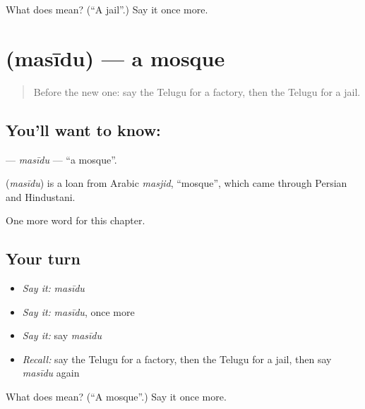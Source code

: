 \begin{tcolorbox}[breakable,colback=teal!4,colframe=teal!35!black,title={Before you move on}]
What does  mean? (\textquotedblleft{}A jail\textquotedblright{}.) Say it once more.
\end{tcolorbox}
\section[\texorpdfstring{\te{మసీదు} (masīdu)}{మసీదు (masīdu)}]{ (masīdu) — a mosque}

\label{lesson:TE-C293-masidu}



\begin{quote}
Before the new one: say the Telugu for a factory, then the Telugu for a jail.
\end{quote}

\subsection*{You'll want to know: }
\textbf{} — \emph{masīdu} — \textquotedblleft{}a mosque\textquotedblright{}.

\begin{cousinweb}
\textbf{} (\emph{masīdu}) is a loan from Arabic \emph{masjid}, \textquotedblleft{}mosque\textquotedblright{}, which came through Persian and Hindustani.
\end{cousinweb}

\begin{grammarlens}[title={What you've built}]
One more word for this chapter.
\end{grammarlens}

\subsection*{Your turn}
\begin{itemize}
\raggedright
  \item \emph{Say it:} \emph{masīdu}
  \item \emph{Say it:} \emph{masīdu}, once more
  \item \emph{Say it:} say \emph{masīdu}
  \item \emph{Recall:} say the Telugu for a factory, then the Telugu for a jail, then say \emph{masīdu} again
\end{itemize}

\begin{tcolorbox}[breakable,colback=teal!4,colframe=teal!35!black,title={Before you move on}]
What does  mean? (\textquotedblleft{}A mosque\textquotedblright{}.) Say it once more.
\end{tcolorbox}
